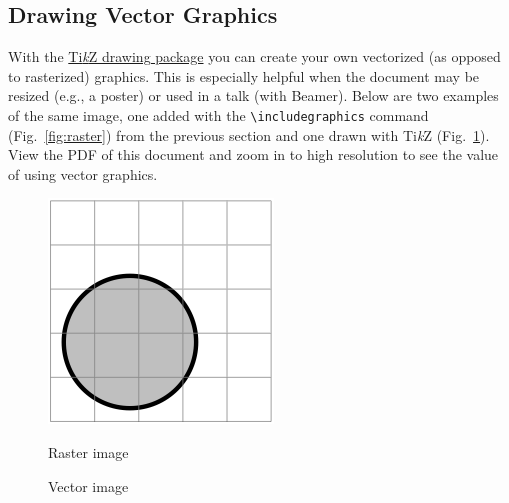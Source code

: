 \documentclass[12pt,letterpaper]{article}
\begin{document}
\subsection{Drawing Vector Graphics}

With the \href{http://www.texample.net/media/pgf/builds/pgfmanualCVS2012-11-04.pdf}{Ti\emph{k}Z drawing package} you can create your own vectorized (as opposed to rasterized) graphics.  This is especially helpful when the document may be resized (e.g., a poster) or used in a talk (with Beamer).  Below are two examples of the same image, one added with the \verb/\includegraphics/ command (Fig.~\ref{fig:raster}) from the previous section and one drawn with Ti\emph{k}Z (Fig.~\ref{fig:vector}).  View the PDF of this document and zoom in to high resolution to see the value of using vector graphics.

\begin{figure}[ht]
\begin{minipage}[c]{0.45\linewidth}
\centering
\includegraphics[width=.83\textwidth]{circle.png}
\caption{Raster image}
\label{fig:raster}
\end{minipage}
\hspace{0.5cm}
\begin{minipage}[c]{0.45\linewidth}
\centering
{}
\caption{Vector image}
\label{fig:vector}
\end{minipage}
\end{figure}
\end{document}
